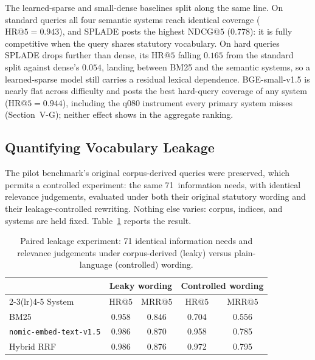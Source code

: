 \documentclass[conference,a4paper]{IEEEtran}
\makeatletter
\newcommand{\nomic}{\texttt{nomic-embed-text-v1.5}\xspace}
\newcommand{\HR}[1]{\mathrm{HR}@{#1}}
\newcommand{\MRR}[1]{\mathrm{MRR}@{#1}}
\newcommand{\NDCG}[1]{\mathrm{NDCG}@{#1}}
\makeatother
\begin{document}
The learned-sparse and small-dense baselines split along the same
line.
On standard queries all four semantic systems reach identical
coverage ($\HR{5}{=}0.943$), and SPLADE posts the highest $\NDCG{5}$
(0.778): it is fully competitive when the query shares statutory
vocabulary.
On hard queries SPLADE drops further than dense, its $\HR{5}$ falling
$0.165$ from the standard split against dense's $0.054$, landing
between BM25 and the semantic systems, so a learned-sparse model
still carries a residual lexical dependence.
BGE-small-v1.5 is nearly flat across difficulty and posts the best
hard-query coverage of any system ($\HR{5}{=}0.944$), including the
q080 instrument every primary system misses (Section~V-G); neither
effect shows in the aggregate ranking.

\subsection{Quantifying Vocabulary Leakage}

The pilot benchmark's original corpus-derived queries were preserved,
which permits a controlled experiment: the same 71~information needs,
with identical relevance judgements, evaluated under both their
original statutory wording and their leakage-controlled rewriting.
Nothing else varies: corpus, indices, and systems are held fixed.
Table~\ref{tab:leakage} reports the result.

\begin{table}[!t]
\renewcommand{\arraystretch}{1.3}
\caption{Paired leakage experiment: 71 identical information needs
  and relevance judgements under corpus-derived (leaky) versus
  plain-language (controlled) wording.}
\label{tab:leakage}
\centering
\small
\begin{tabular}{@{}lcccc@{}}
\toprule
& \multicolumn{2}{c}{Leaky wording}
& \multicolumn{2}{c}{Controlled wording} \\
\cmidrule(lr){2-3}\cmidrule(lr){4-5}
System & $\HR{5}$ & $\MRR{5}$ & $\HR{5}$ & $\MRR{5}$ \\
\midrule
BM25       & 0.958 & 0.846 & 0.704 & 0.556 \\
\nomic     & 0.986 & 0.870 & 0.958 & 0.785 \\
Hybrid RRF & 0.986 & 0.876 & 0.972 & 0.795 \\
\bottomrule
\end{tabular}
\end{table}
\end{document}
